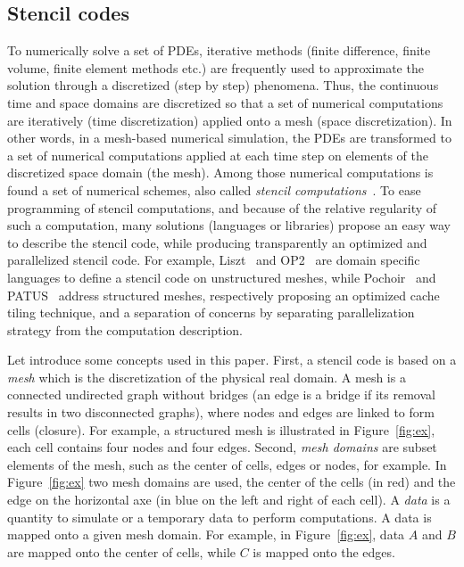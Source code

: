 \subsection{Stencil codes}
\label{sect:stencil}
To numerically solve a set of PDEs, iterative methods (finite difference, finite volume, finite element methods etc.) are frequently used to approximate the solution through a discretized (step by step) phenomena. Thus, the continuous time and space domains are discretized so that a set of numerical computations are iteratively (time discretization) applied onto a mesh (space discretization). In other words, in a mesh-based numerical simulation, the PDEs are transformed to a set of numerical computations applied at each time step on elements of the discretized space domain (the mesh). Among those numerical computations is found a set of numerical schemes, also called \textit{stencil computations}~\cite{spaaTangCKLL11}. To ease programming of stencil computations, and because of the relative regularity of such a computation, many solutions (languages or libraries) propose an easy way to describe the stencil code, while producing transparently an optimized and parallelized stencil code. For example, Liszt~\cite{DeVito2011LDS} and OP2~\cite{Giles2011} are domain specific languages to define a stencil code on unstructured meshes, while Pochoir~\cite{spaaTangCKLL11} and PATUS~\cite{citeulike12258902} address structured meshes, respectively proposing an optimized cache tiling technique, and a separation of concerns by separating parallelization strategy from the computation description.

Let introduce some concepts used in this paper. First, a stencil code is based on a \emph{mesh} which is the discretization of the physical real domain. A mesh is a connected undirected graph without bridges (an edge is a bridge if its removal results in two disconnected graphs), where nodes and edges are linked to form cells (closure). For example, a structured mesh is illustrated in Figure~\ref{fig:ex}, each cell contains four nodes and four edges. Second, \emph{mesh domains} are subset elements of the mesh, such as the center of cells, edges or nodes, for example. In Figure~\ref{fig:ex} two mesh domains are used, the center of the cells (in red) and the edge on the horizontal axe (in blue on the left and right of each cell). A \emph{data} is a quantity to simulate or a temporary data to perform computations. A data is mapped onto a given mesh domain. For example, in Figure~\ref{fig:ex}, data $A$ and $B$ are mapped onto the center of cells, while $C$ is mapped onto the edges.

